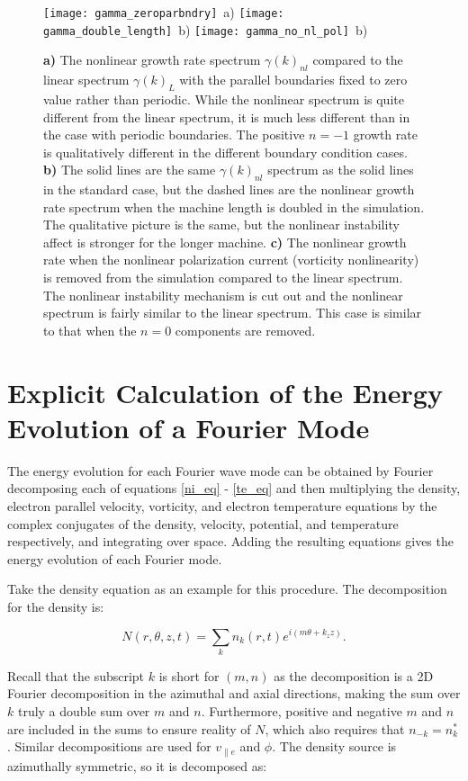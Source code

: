 \documentclass[12pt]{article}
\def\beq{\begin{equation}}
\def\eeq{\end{equation}}
\newcommand{\vpe}{v_{\parallel e}}
\begin{document}
\begin{figure}
\texttt{[image: gamma\_zeroparbndry]}~a)
\hfil
\texttt{[image: gamma\_double\_length]}~b)
\hfil
\texttt{[image: gamma\_no\_nl\_pol]}~b)
\hfil
\caption{\textbf{a)} The nonlinear growth rate spectrum $\gamma(k)_{nl}$ compared to the linear spectrum $\gamma(k)_L$ with the parallel boundaries fixed to zero value rather than periodic. While
the nonlinear spectrum is quite different from the linear spectrum, it is much less different than in the case with periodic boundaries. The positive $n=-1$ growth rate is qualitatively different
in the different boundary condition cases.
\textbf{b)} The solid lines are the same $\gamma(k)_{nl}$ spectrum as the solid lines in the standard case, but the dashed lines are the nonlinear growth rate spectrum when the machine length is
doubled in the simulation. The qualitative picture is the same, but the nonlinear instability affect is stronger for the longer machine. 
\textbf{c)} The nonlinear growth rate when the nonlinear polarization current (vorticity nonlinearity) is removed from the simulation compared to the linear spectrum. The nonlinear instability
mechanism is cut out and the nonlinear spectrum is fairly similar to the linear spectrum. This case is similar to that when the $n=0$ components are removed.}
\label{gamma_no_n0_figs}
\end{figure}


\appendix

\section{Explicit Calculation of the Energy Evolution of a Fourier Mode}

The energy evolution for each Fourier wave mode can be obtained by Fourier decomposing each of equations \ref{ni_eq} - \ref{te_eq}
and then multiplying the density, electron parallel velocity, vorticity, and electron temperature equations by the complex conjugates of the 
density, velocity, potential, and temperature respectively, and integrating over space.
Adding the resulting equations gives the energy evolution of each Fourier mode.

Take the density equation as an example for this procedure. The decomposition for the density is:

\beq
\label{density_decomp}
N(r,\theta,z,t) = \sum_{k} n_k(r,t) e^{i(m \theta + k_z z)}.
\eeq

Recall that the subscript $k$ is short for $(m,n)$ as the decomposition is a 2D Fourier decomposition in the azimuthal and axial directions, making the sum over $k$ truly
a double sum over $m$ and $n$. Furthermore, positive and negative
$m$ and $n$ are included in the sums to ensure reality of $N$, which also requires that $n_{-k} = n_k^*$.
Similar decompositions are used for $\vpe$ and $\phi$. The density source is azimuthally symmetric, so it is decomposed as:
\end{document}
